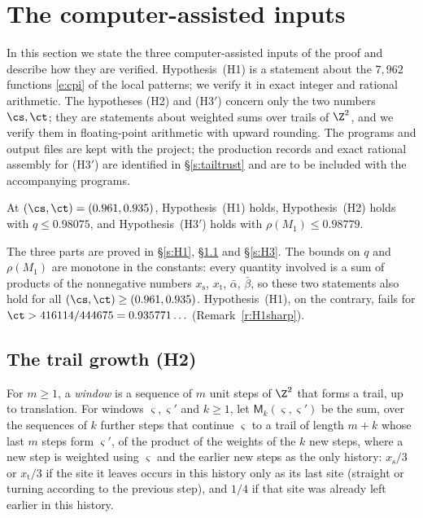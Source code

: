 \section{The computer-assisted inputs}\label{s:computer}

In this section we state the three computer-assisted inputs of the proof and describe how they are verified. Hypothesis~(H1) is a statement about the $7{,}962$ functions \eqref{e:cpi} of the local patterns; we verify it in exact integer and rational arithmetic. The hypotheses (H2) and (H3$'$) concern only the two numbers $\cs, \ct$; they are statements about weighted sums over trails of $\Z^2$, and we verify them in floating-point arithmetic with upward rounding. The programs and output files are kept with the project; the production records and exact rational assembly for (H3$'$) are identified in \S\ref{s:tailtrust} and are to be included with the accompanying programs.

\begin{theorem}\label{t:inputs}
At $(\cs, \ct) = (0.961, 0.935)$, Hypothesis~(H1) holds, Hypothesis~(H2) holds with $q \le 0.98075$, and Hypothesis~(H3$'$) holds with $\rho(M_1) \le 0.98779$.
\end{theorem}

The three parts are proved in \S\ref{s:H1}, \S\ref{s:H2} and \S\ref{s:H3}. The bounds on $q$ and $\rho(M_1)$ are monotone in the constants: every quantity involved is a sum of products of the nonnegative numbers $x_{\mathrm s}$, $x_{\mathrm t}$, $\bar\alpha$, $\bar\beta$, so these two statements also hold for all $(\cs, \ct) \ge (0.961, 0.935)$. Hypothesis~(H1), on the contrary, fails for $\ct > 416114/444675 = 0.935771\ldots$ (Remark~\ref{r:H1sharp}).

\subsection{The trail growth (H2)}\label{s:H2}

For $m \ge 1$, a \emph{window} is a sequence of $m$ unit steps of $\Z^2$ that forms a trail, up to translation. For windows $\varsigma, \varsigma'$ and $k \ge 1$, let $\mathsf M_k(\varsigma, \varsigma')$ be the sum, over the sequences of $k$ further steps that continue $\varsigma$ to a trail of length $m + k$ whose last $m$ steps form $\varsigma'$, of the product of the weights of the $k$ new steps, where a new step is weighted using $\varsigma$ and the earlier new steps as the only history: $x_{\mathrm s}/3$ or $x_{\mathrm t}/3$ if the site it leaves occurs in this history only as its last site (straight or turning according to the previous step), and $1/4$ if that site was already left earlier in this history.

